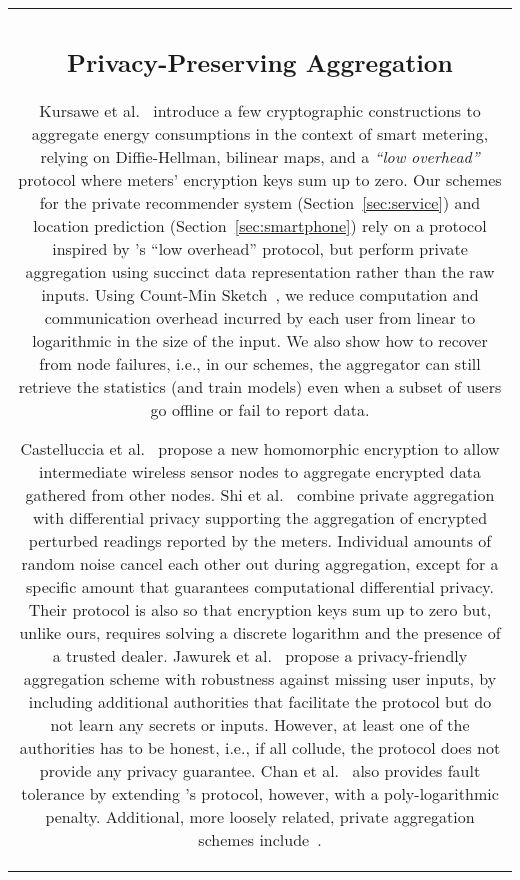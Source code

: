 \documentclass[conference]{IEEEtran}
\begin{document}
\begin{figure*}[ht!]
{\begin{tabular}{|c|}
\subsection{Privacy-Preserving Aggregation}
\label{sec: data-aggr} 
Kursawe et al.~\cite{Kursawe:2011} introduce a few cryptographic constructions to aggregate energy consumptions in the context of smart metering, relying on Diffie-Hellman, bilinear maps, and a {\em ``low overhead''} protocol where meters' encryption keys sum up to zero. 
Our schemes for the private recommender system (Section~\ref{sec:service}) 
and location prediction (Section~\ref{sec:smartphone}) rely on 
a protocol inspired by \cite{Kursawe:2011}'s ``low overhead'' protocol, but perform private aggregation using succinct data representation rather than the raw inputs. Using Count-Min Sketch~\cite{cormode2005improved}, we reduce computation and communication overhead incurred by each user from linear to logarithmic in the size of the input. We also show how to recover from node failures, i.e., in our schemes, the aggregator can still retrieve the statistics (and train models) even when a subset of users go offline or fail to report data.

Castelluccia et al.~\cite{Mobiquitous05} propose a new homomorphic encryption to allow intermediate wireless sensor nodes to aggregate encrypted data gathered from other nodes.  Shi et al.~\cite{shi2011privacy} combine private aggregation with differential privacy supporting the aggregation of encrypted perturbed readings reported by the meters. Individual amounts of random noise cancel each other out during aggregation, except for a specific amount that guarantees computational differential privacy. Their protocol is also so that encryption keys sum up to zero but, unlike ours, requires solving a discrete logarithm and the presence of a trusted dealer. 
Jawurek et al.~\cite{jawurek2012fault} propose a privacy-friendly aggregation scheme with robustness against missing user inputs, by including additional authorities that facilitate the protocol but do not learn any secrets or inputs.
However, at least one of the authorities has to be honest, i.e., if all collude, the protocol does not provide any privacy guarantee.
Chan et al.~\cite{chan2012privacy} also provides fault tolerance by extending 
\cite{shi2011privacy}'s protocol, however, with a poly-logarithmic penalty. 
Additional, more loosely related, private aggregation schemes include~\cite{Mobiquitous05,erkin2012private,bilogrevic2014s}. 



\end{tabular}}
\end{figure*}
\end{document}
